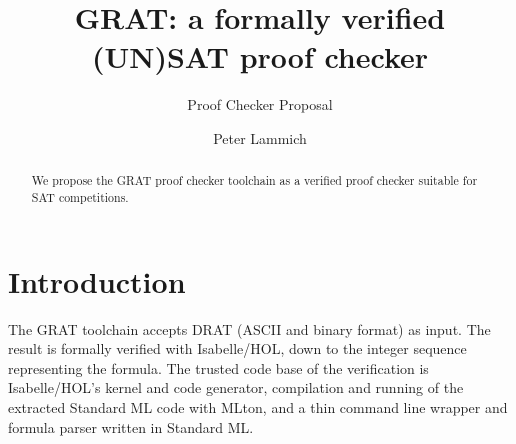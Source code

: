 \documentclass{llncs}     %
\begin{document}
\title{GRAT: a formally verified (UN)SAT proof checker}
\subtitle{Proof Checker Proposal}

\author{Peter Lammich}


\maketitle

\begin{abstract}
We propose the GRAT proof checker toolchain as a verified proof checker suitable for SAT competitions.

\end{abstract}

% 
% 

\section{Introduction}

The GRAT toolchain accepts DRAT (ASCII and binary format) as input.
The result is formally verified with Isabelle/HOL, down to the integer sequence representing the formula.
The trusted code base of the verification is Isabelle/HOL's kernel and code generator,
compilation and running of the extracted Standard ML code with MLton, and a thin command line wrapper and formula parser
written in Standard ML.
\end{document}
